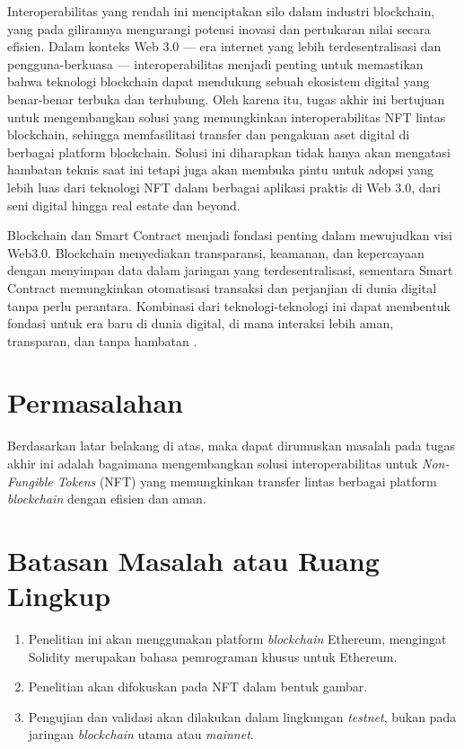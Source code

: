 Interoperabilitas yang rendah ini menciptakan silo dalam industri blockchain, yang pada gilirannya mengurangi potensi inovasi dan pertukaran nilai secara efisien. Dalam konteks Web 3.0 — era internet yang lebih terdesentralisasi dan pengguna-berkuasa — interoperabilitas menjadi penting untuk memastikan bahwa teknologi blockchain dapat mendukung sebuah ekosistem digital yang benar-benar terbuka dan terhubung. Oleh karena itu, tugas akhir ini bertujuan untuk mengembangkan solusi yang memungkinkan interoperabilitas NFT lintas blockchain, sehingga memfasilitasi transfer dan pengakuan aset digital di berbagai platform blockchain. Solusi ini diharapkan tidak hanya akan mengatasi hambatan teknis saat ini tetapi juga akan membuka pintu untuk adopsi yang lebih luas dari teknologi NFT dalam berbagai aplikasi praktis di Web 3.0, dari seni digital hingga real estate dan beyond.

Blockchain dan Smart Contract menjadi fondasi penting dalam mewujudkan visi Web3.0. Blockchain menyediakan transparansi, keamanan, dan kepercayaan dengan menyimpan data dalam jaringan yang terdesentralisasi, sementara Smart Contract memungkinkan otomatisasi transaksi dan perjanjian di dunia digital tanpa perlu perantara. Kombinasi dari teknologi-teknologi ini dapat membentuk fondasi untuk era baru di dunia digital, di mana interaksi lebih aman, transparan, dan tanpa hambatan \cite{Gadekallu2022}. 

\section{Permasalahan}
\label{sec:permasalahan}
Berdasarkan latar belakang di atas, maka dapat dirumuskan masalah pada tugas akhir ini adalah bagaimana mengembangkan solusi interoperabilitas untuk \emph{Non-Fungible Tokens} (NFT) yang memungkinkan transfer lintas berbagai platform \emph{blockchain} dengan efisien dan aman.

\section{Batasan Masalah atau Ruang Lingkup}
\label{sec:batasanmasalah}
\begin{enumerate}[nolistsep]

  \item Penelitian ini akan menggunakan platform \emph{blockchain} Ethereum, mengingat Solidity merupakan bahasa pemrograman khusus untuk Ethereum.

  \item Penelitian akan difokuskan pada NFT dalam bentuk gambar.
  
  \item Pengujian dan validasi akan dilakukan dalam lingkungan \emph{testnet}, bukan pada jaringan \emph{blockchain} utama atau \emph{mainnet}.

\end{enumerate}

